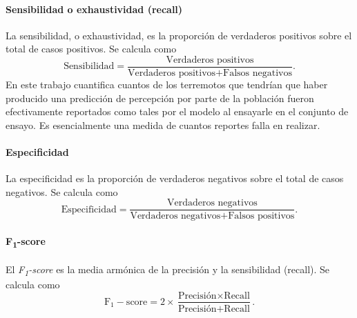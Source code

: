 \documentclass[a4paper]{report}
\begin{document}
\paragraph{Sensibilidad o exhaustividad (recall)}
La sensibilidad, o exhaustividad, es la proporción de verdaderos positivos sobre el total de casos positivos.
Se calcula como
\begin{equation}
	\text{Sensibilidad} = \frac{\text{Verdaderos positivos}}{\text{Verdaderos positivos} + \text{Falsos negativos}}.
\end{equation}
En este trabajo cuantifica cuantos de los terremotos que tendrían que haber producido una predicción de percepción por parte de la población fueron efectivamente reportados como tales por el modelo al ensayarle en el conjunto de ensayo.
Es esencialmente una medida de cuantos reportes falla en realizar.


\paragraph{Especificidad}
La especificidad es la proporción de verdaderos negativos sobre el total de casos negativos.
Se calcula como
\begin{equation}
	\text{Especificidad} = \frac{\text{Verdaderos negativos}}{\text{Verdaderos negativos} + \text{Falsos positivos}}.
\end{equation}


\paragraph{F\textsubscript{1}-score}
El \emph{F\textsubscript{1}-score} es la media armónica de la precisión y la sensibilidad (recall).
Se calcula como
\begin{equation}
	\mathrm{F_1-score} = 2 \times \frac{\text{Precisión} \times \text{Recall}}{\text{Precisión} + \text{Recall}}.
\end{equation}
\end{document}

